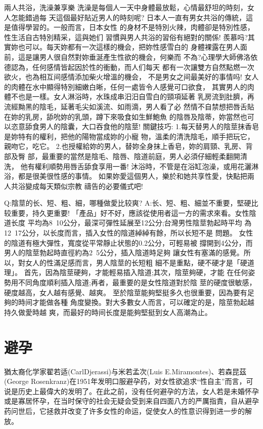 \documentclass[12pt,UTF8]{ctexbook}
\begin{document}
兩人共浴，洗澡兼享樂
洗澡是每個人一天中身體最放鬆，心情最舒坦的時刻，女人怎能錯過每
天這個最好貼近男人的時刻呢?
日本人一直有男女共浴的傳統，這是值得學習的。一般而言，日本女性
的身材不是特別火辣，肉體卻是特別性感，性生活自古特別精采，這與她们
習慣與男人共浴的習俗有絕對的關係!
羨慕吗?其實妳也可以。每天妳都有一次這樣的機会，把妳性感雪白的
身體裸露在男人面前，這是讓男人很自然對妳垂涎產生性欲的機会，何樂而
不為?心理學大師佛洛依德認為，任何感情皆起因於性的衝動，而人们每天
都有一次讓雙方自然點燃一次欲火，也為相互间感情添加柴火增溫的機会，
不是男女之间最美好的事情吗!
女人的肉體在水中顯得特別細嫩白晰，任何一處皆令人感覺可口欲食，
其實男人的肉體不也是一樣。女人淋浴時，水珠成串汨汨自雪白的頸項延著
乳房流到肚臍，再流經黝黑的陰毛，延著毛尖如溪流、如雨滴，男人看了必
然情不自禁想把唇舌貼在妳的乳房，舔吮妳的乳頭，蹲下來吸食如生鮮鮑魚
的陰唇及陰蒂，妳當然也可以恣意舔食男人的陰囊，大口吞食他的陰莖!
關鍵技巧:
1.每天替男人的陰莖抹香皂是妳特有的權利，把他的陽物當成妳的小寵
物，溫柔的清洗陰毛，順手把玩它，親吻它，吃它。
2.也授權給妳的男人，替妳全身抹上香皂，妳的肩頸、乳房、背部及臀
部，最重要的當然是陰毛、陰唇、陰道前庭，男人必須仔細輕柔翻開清洗，
他有權利順勢用唇舌舔食享用一番!
沐浴時，不管是在浴缸泡澡，或用花灑淋浴，都是很美很性感的事情。
如果妳愛這個男人，樂於和她共享性愛，快點把兩人共浴變成每天類似宗教
禱告的必要儀式吧!

Q:陰莖的长、短、粗、細，哪種做愛比较爽?
A:长、短、粗、細並不重要，堅硬比较重要，持久更重要!
「產品」好不好，應該從使用者這一方的需求來看。女性陰道长度
平均為8~10公分，最深可彈性延展至12公分;台灣男性陰莖勃起時平均
為12~17公分，以长度而言，插入女性的陰道綽綽有餘，所以长短不是
問題。
女性的陰道有極大彈性，寬度從平常靜止状態的0.2公分，可輕易被
撐開到4公分，而男人的陰莖勃起時直徑約為2~5公分，插入陰道時足夠
讓女性有塞滿的感覺。所以，對女人的性滿足感而言，男人陰莖的长短粗
細不是重點，硬不硬才是「硬道理」。
首先，因為陰莖硬夠，才能輕易插入陰道;其次，陰莖夠硬，才能
在任何姿勢用不同角度順利插入陰道;再者，最重要的是女性陰道對於陰
莖的硬度很敏感，硬度越高，女人越有感覺、越爽。
至於陰莖能夠堅挺多久也很重要，因為要有足夠的時间才能做各種
角度變換。對大多數女人而言，可以確定的是，陰莖勃起越持久做愛時越
爽，而最好的時间长度是能夠堅挺到女人高潮為止。



\chapter{避孕}

猶太裔化学家翟若适(CarlDjerassi)与米若孟次(Luis E.Miramontes)、若森昆茲(George Rosenkranz)在1951年发明口服避孕药，对女性欲追求“性自主”而言，可说是历史上最偉大的发明了。在此之前，没有任何避孕的方法，女人若是未婚怀孕或是寡居怀孕，在当时保守的社会无疑会受到来自四面八方的严厲指責，自从避孕药问世后，它拯救并改变了许多女性的命运，促使女人的性意识得到进一步的解放。
\end{document}
